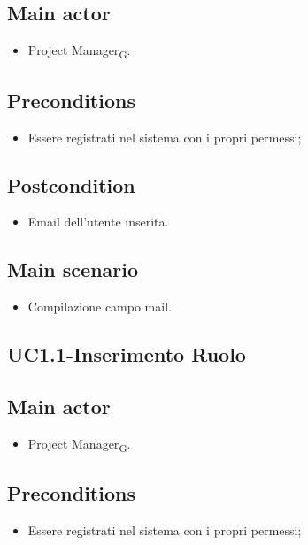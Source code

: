 \documentclass{article}
\begin{document}
     \subsection*{Main actor}
         \begin{itemize}
             \item Project Manager\textsubscript{G}.
         \end{itemize}
     \subsection*{Preconditions} 
        \begin{itemize}
            \item Essere registrati nel sistema con i propri permessi;
        \end{itemize}
        \subsection*{Postcondition} 
        \begin{itemize}
            \item Email dell'utente inserita.
        \end{itemize}
        \subsection*{Main scenario}
        \begin{itemize}
        \item Compilazione campo mail.
        \end{itemize}

\subsection{UC1.1-Inserimento Ruolo}
    
     \subsection*{Main actor}
         \begin{itemize}
             \item Project Manager\textsubscript{G}.
         \end{itemize}
     \subsection*{Preconditions} 
        \begin{itemize}
            \item Essere registrati nel sistema con i propri permessi;
        \end{itemize}
\end{document}

